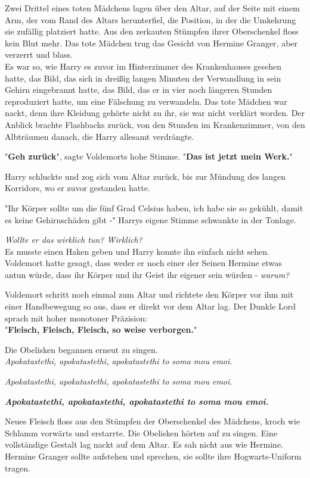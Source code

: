 {Zwei Drittel eines toten Mädchens lagen über den Altar, auf der Seite mit einem Arm, der vom Rand des Altars herunterfiel, die Position, in der die Umkehrung sie zufällig platziert hatte. Aus den zerkauten Stümpfen ihrer Oberschenkel floss kein Blut mehr. Das tote Mädchen trug das Gesicht von Hermine Granger, aber verzerrt und blass.\\ Es war so, wie Harry es zuvor im Hinterzimmer des Krankenhauses gesehen hatte, das Bild, das sich in dreißig langen Minuten der Verwandlung in sein Gehirn eingebrannt hatte, das Bild, das er in vier noch längeren Stunden reproduziert hatte, um eine Fälschung zu verwandeln. Das tote Mädchen war nackt, denn ihre Kleidung gehörte nicht zu ihr, sie war nicht verklärt worden. Der Anblick brachte Flashbacks zurück, von den Stunden im Krankenzimmer, von den Albträumen danach, die Harry allesamt verdrängte.

"\textbf{Geh zurück}", sagte Voldemorts hohe Stimme. "\textbf{Das ist jetzt mein Werk.}"

Harry schluckte und zog sich vom Altar zurück, bis zur Mündung des langen Korridors, wo er zuvor gestanden hatte.

"Ihr Körper sollte um die fünf Grad Celsius haben, ich habe sie so gekühlt, damit es keine Gehirnschäden gibt -" Harrys eigene Stimme schwankte in der Tonlage.

\emph{Wollte er das wirklich tun? Wirklich?}\\ Es musste einen Haken geben und Harry konnte ihn einfach nicht sehen. Voldemort hatte gesagt, dass weder er noch einer der Seinen Hermine etwas antun würde, dass ihr Körper und ihr Geist ihr eigener sein würden - \emph{warum?}

Voldemort schritt noch einmal zum Altar und richtete den Körper vor ihm mit einer Handbewegung so aus, dass er direkt vor dem Altar lag. Der Dunkle Lord sprach mit hoher monotoner Präzision:\\ "\textbf{Fleisch, Fleisch, Fleisch, so weise verborgen.}"

Die Obelisken begannen erneut zu singen.\\

\emph{Apokatastethi, apokatastethi, apokatastethi to soma mou emoi.}

\emph{Apokatastethi, apokatastethi, apokatastethi to soma mou emoi.}

\textbf{\emph{Apokatastethi, apokatastethi, apokatastethi to soma mou emoi.}}

Neues Fleisch floss aus den Stümpfen der Oberschenkel des Mädchens, kroch wie Schlamm vorwärts und erstarrte. Die Obelisken hörten auf zu singen. Eine vollständige Gestalt lag nackt auf dem Altar. Es sah nicht aus wie Hermine. Hermine Granger sollte aufstehen und sprechen, sie sollte ihre Hogwarts-Uniform tragen.

}
